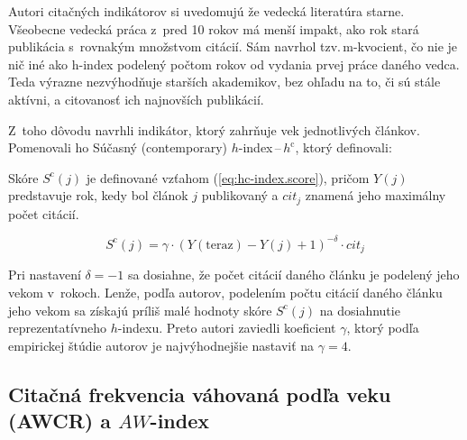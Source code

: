 Autori citačných indikátorov si uvedomujú že vedecká literatúra starne.
Všeobecne vedecká práca z~pred 10 rokov má menší impakt, ako rok stará
publikácia s~rovnakým množstvom citácií.  Sám \citet{Hirsch2005} navrhol
tzv.\,m-kvocient, čo nie je nič iné ako h-index podelený počtom rokov od vydania
prvej práce daného vedca.  Teda výrazne nezvýhodňuje starších akademikov, bez
ohľadu na to, či sú stále aktívni, a citovanosť ich najnovších publikácií.

Z~toho dôvodu \citet{Sidiropoulos2007} navrhli indikátor, ktorý zahrňuje vek
jednotlivých článkov.  Pomenovali ho Súčasný (contemporary) $h$-index\,--\,$h^{\mathrm{c}}$,
ktorý definovali:


Skóre $S^{\mathrm{c}}(j)$ je definované vzťahom (\ref{eq:hc-index.score}), pričom $Y(j)$
predstavuje rok, kedy bol článok $j$ publikovaný a $\mathit{cit}_j$ znamená jeho
maximálny počet citácií.

\begin{equation}
\label{eq:hc-index.score}
S^{\mathrm{c}}(j) = \gamma\cdot (Y(\mathrm{teraz}) - Y(j) + 1)^{-\delta}\cdot \mathit{cit}_j
\end{equation}

Pri nastavení $\delta = -1$ sa dosiahne, že počet citácií daného článku je
podelený jeho vekom v~rokoch.  Lenže, podľa autorov, podelením počtu citácií
daného článku jeho vekom sa získajú príliš malé hodnoty skóre
$S^{\mathrm{c}}(j)$ na dosiahnutie reprezentatívneho $h$-indexu.  Preto autori
zaviedli koeficient $\gamma$, ktorý podľa empirickej štúdie autorov je
najvýhodnejšie  nastaviť na $\gamma = 4$.

\subsection{Citačná frekvencia váhovaná podľa veku (AWCR) a $\mathit{AW}$-index}
\label{sec:aw-index}


